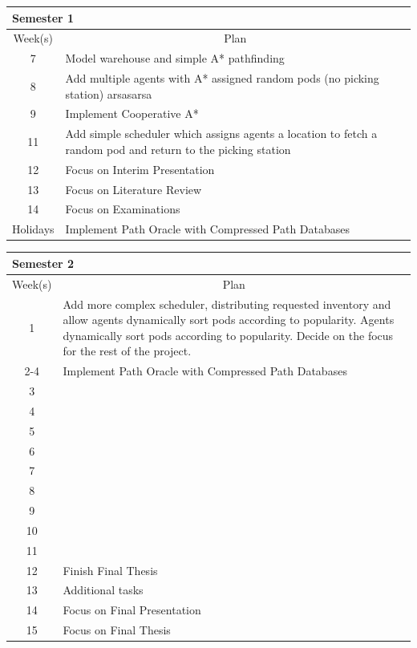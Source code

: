 \documentclass[a4paper,11pt]{article}
\begin{document}
\begin{center}
{\footnotesize
\begin{tabular}{ c p{12cm} }
\multicolumn{2}{l}{\textbf{Semester 1}} \\
\hline \multicolumn{1}{c}{Week(s)} & \multicolumn{1}{c}{Plan} \\
\hline 7  & Model warehouse and simple A* pathfinding \\
\hline 8  & Add multiple agents with A* assigned random pods (no picking station) arsasarsa\\
\hline 9  & Implement Cooperative A* \\
\hline 11 & Add simple scheduler which assigns agents a location to fetch a random pod and return to the picking station \\
\hline 12 & Focus on Interim Presentation \\
\hline 13 & Focus on Literature Review \\
\hline 14 & Focus on Examinations \\
\hline Holidays & Implement Path Oracle with Compressed Path Databases \\
\hline
\end{tabular}
}


{\footnotesize
\vspace{0.5cm}
\begin{tabular}{ c p{12cm} }
\multicolumn{2}{l}{\textbf{Semester 2}} \\
\hline \multicolumn{1}{c}{Week(s)} & \multicolumn{1}{c}{Plan} \\
\hline 1  & Add more complex scheduler, distributing requested inventory  and allow agents dynamically sort pods according to popularity. Agents dynamically sort pods according to popularity. Decide on the focus for the rest of the project. \\
\hline 2-4 & Implement Path Oracle with Compressed Path Databases \\
\hline 3  &  \\
\hline 4  & \\
\hline 5  &   \\
\hline 6  &  \\
\hline 7  & \\
\hline 8  & \\
\hline 9  & \\
\hline 10 & \\
\hline 11 & \\
\hline 12 & Finish Final Thesis \\
\hline 13 & Additional tasks \\
\hline 14 & Focus on Final Presentation \\
\hline 15 & Focus on Final Thesis \\
\hline
\end{tabular}
}
\end{center}
\end{document}
